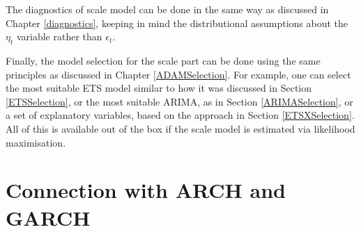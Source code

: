 \documentclass[]{book}
\theoremstyle{definition}
\theoremstyle{definition}
\theoremstyle{definition}
\theoremstyle{definition}
\theoremstyle{remark}
\begin{document}
The diagnostics of scale model can be done in the same way as discussed in Chapter \ref{diagnostics}, keeping in mind the distributional assumptions about the \(\eta_t\) variable rather than \(\epsilon_t\).

Finally, the model selection for the scale part can be done using the same principles as discussed in Chapter \ref{ADAMSelection}. For example, one can select the most suitable ETS model similar to how it was discussed in Section \ref{ETSSelection}, or the most suitable ARIMA, as in Section \ref{ARIMASelection}, or a set of explanatory variables, based on the approach in Section \ref{ETSXSelection}. All of this is available out of the box if the scale model is estimated via likelihood maximisation.

\hypertarget{ADAMscaleModelGARCH}{%
\section{Connection with ARCH and GARCH}\label{ADAMscaleModelGARCH}}
\end{document}
